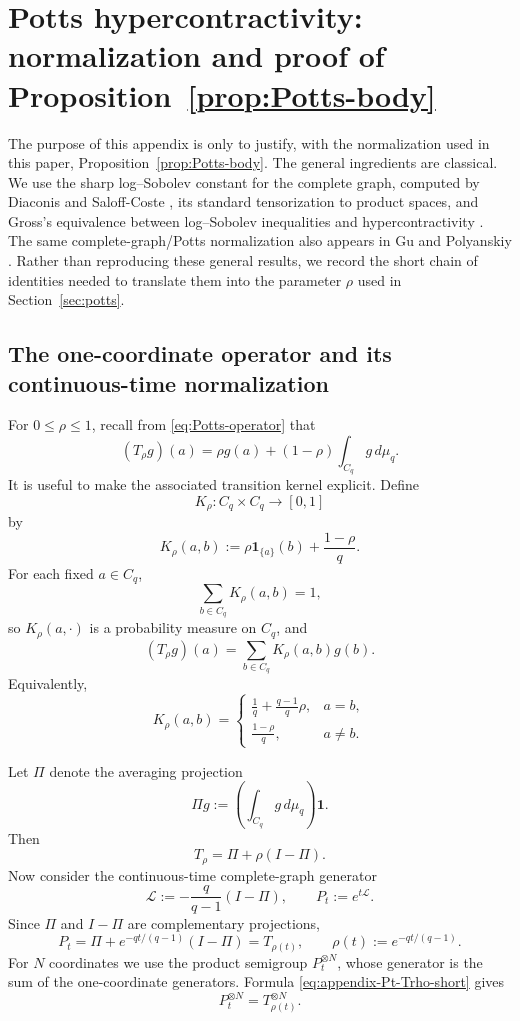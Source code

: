 \documentclass[11pt,a4paper]{article}
\numberwithin{equation}{section}
\theoremstyle{cleanplain}
\theoremstyle{cleandefinition}
\theoremstyle{cleanremark}
\begin{document}
\appendix
\section{Potts hypercontractivity: normalization and proof of Proposition~\ref{prop:Potts-body}}\label{app:potts-details}

{\color{black}
The purpose of this appendix is only to justify, with the normalization used in
this paper, Proposition~\ref{prop:Potts-body}.  The general ingredients are
classical.  We use the sharp log--Sobolev constant for the complete graph,
computed by Diaconis and Saloff-Coste \cite{DSC}, its standard tensorization to
product spaces, and Gross's equivalence between log--Sobolev inequalities and
hypercontractivity \cite{Gross}.  The same complete-graph/Potts normalization
also appears in Gu and Polyanskiy \cite{GuPolyanskiy}.  Rather than reproducing
these general results, we record the short chain of identities needed to
translate them into the parameter $\rho$ used in Section~\ref{sec:potts}.

\subsection{The one-coordinate operator and its continuous-time normalization}

For $0\leq\rho\leq1$, recall from \eqref{eq:Potts-operator} that
\[
 (T_\rho g)(a)
 =\rho g(a)+(1-\rho)\int_{C_q}g\,d\mu_q.
\]
It is useful to make the associated transition kernel explicit.  Define
\[
 K_\rho:C_q\times C_q\longrightarrow[0,1]
\]
by
\[
 K_\rho(a,b)
 :=\rho\mathbf 1_{\{a\}}(b)+\frac{1-\rho}{q}.
\]
For each fixed $a\in C_q$,
\[
 \sum_{b\in C_q}K_\rho(a,b)=1,
\]
so $K_\rho(a,\cdot)$ is a probability measure on $C_q$, and
\[
 (T_\rho g)(a)=\sum_{b\in C_q}K_\rho(a,b)g(b).
\]
Equivalently,
\begin{equation}\label{eq:appendix-kernel-short}
 K_\rho(a,b)
 =
 \begin{cases}
 \displaystyle \frac1q+\frac{q-1}{q}\rho,&a=b,\\[2mm]
 \displaystyle \frac{1-\rho}{q},&a\neq b.
 \end{cases}
\end{equation}

Let $\Pi$ denote the averaging projection
\[
 \Pi g:=\left(\int_{C_q}g\,d\mu_q\right)\mathbf 1.
\]
Then
\begin{equation}\label{eq:appendix-Trho-Pi-short}
 T_\rho=\Pi+\rho(I-\Pi).
\end{equation}
Now consider the continuous-time complete-graph generator
\[
 \mathcal L:=-\frac q{q-1}(I-\Pi),
 \qquad P_t:=e^{t\mathcal L}.
\]
Since $\Pi$ and $I-\Pi$ are complementary projections,
\begin{equation}\label{eq:appendix-Pt-Trho-short}
 P_t
 =\Pi+e^{-qt/(q-1)}(I-\Pi)
 =T_{\rho(t)},
 \qquad
 \rho(t):=e^{-qt/(q-1)}.
\end{equation}
For $N$ coordinates we use the product semigroup
$P_t^{\otimes N}$, whose generator is the sum of the one-coordinate
generators.  Formula \eqref{eq:appendix-Pt-Trho-short} gives
\[
 P_t^{\otimes N}=T_{\rho(t)}^{\otimes N}.
\]

}
\end{document}
